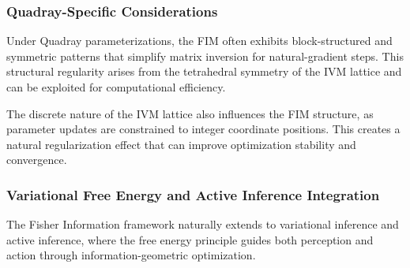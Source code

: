 \documentclass[
  10pt,
]{article}
\begin{document}
\subsubsection{Quadray-Specific
Considerations}\label{quadray-specific-considerations}

Under Quadray parameterizations, the FIM often exhibits block-structured
and symmetric patterns that simplify matrix inversion for
natural-gradient steps. This structural regularity arises from the
tetrahedral symmetry of the IVM lattice and can be exploited for
computational efficiency.

The discrete nature of the IVM lattice also influences the FIM
structure, as parameter updates are constrained to integer coordinate
positions. This creates a natural regularization effect that can improve
optimization stability and convergence.

\subsubsection{Variational Free Energy and Active Inference
Integration}\label{variational-free-energy-and-active-inference-integration}

The Fisher Information framework naturally extends to variational
inference and active inference, where the free energy principle guides
both perception and action through information-geometric optimization.
\end{document}
